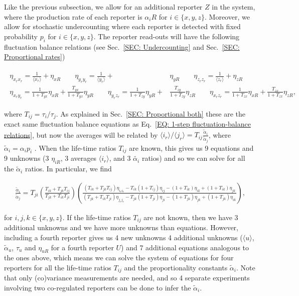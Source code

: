 \documentclass[%
 reprint,prx,
superscriptaddress,
%
%
%
%
%
%
%
%
%
 amsmath,amssymb,
 aps,
%
%
%
%
%
%
]{revtex4-2}
\begin{document}
{{Like the previous subsection, we allow for an additional reporter $Z$ in the system, where the production rate of each reporter is $\alpha_{i}R$ for $i \in \{x,y,z\}$. 
Moreover, we allow for stochastic undercounting where each reporter is detected with fixed probability $p_{i}$ for $i \in \{x,y,z\}$. 
The reporter read-outs will have the following fluctuation balance relations (see Sec.~\ref{SEC: Undercounting} and Sec.~\ref{SEC: Proportional rates})
\begin{widetext}
\begin{align*}
 \begin{split}
  \eta_{x_{r}x_{r}} = \frac{1}{\langle x_{r} \rangle} + \eta_{xR} \quad \quad  \eta_{y_{r}y_{r}} = \frac{1}{\langle y_{r} \rangle} + & \eta_{yR} \quad \quad  \eta_{z_{r}z_{r}} = \frac{1}{\langle z_{r} \rangle} + \eta_{zR} \\
  \eta_{x_{r}y_{r}} = \frac{1}{1 + T_{yx}}\eta_{xR} + \frac{T_{yx}}{1 + T_{yx}}\eta_{yR} \quad \quad \eta_{y_{r}z_{r}} = \frac{1}{1 + T_{zy}}\eta_{yR} + & \frac{T_{zy}}{1 + T_{zy}}\eta_{zR} \quad \quad \eta_{x_{r}z_{r}} = \frac{1}{1 + T_{zx}}\eta_{xR} + \frac{T_{zx}}{1 + T_{zx}}\eta_{zR} ,
 \end{split}
%
\end{align*}
\end{widetext}
where $T_{ij} = \tau_{i}/ \tau_{j}$. As explained in Sec.~\ref{SEC: Proportional both} these are the exact same fluctuation balance equations as Eq.~\eqref{EQ: 1-step fluctuation-balance relations}, but now the averages will be related by $\langle i_{r} \rangle / \langle j_{r} \rangle = T_{ij}\frac{\tilde{\alpha}_{i}}{\tilde{\alpha}_{j}}$, where $\tilde{\alpha}_{i} = \alpha_{i}p_{i}$ . When 
the life-time ratios $T_{ij}$ are known, this gives us 9 equations and 9 unknowns (3 $\eta_{iR}$, 3 averages $\langle i_{r} \rangle$, and 3 $\tilde{\alpha_{i}}$ ratios) and so we can solve for all the $\tilde{\alpha}_{i}$ ratios. In particular, we find %
\begin{widetext}
\begin{align}
 \frac{\tilde{\alpha}_{i}}{\tilde{\alpha}_{j}} = T_{ji}\left(\frac{T_{ik} + T_{jk}T_{ij}}{T_{jk} + T_{ik}T_{ji}}\right) \left(\frac{(T_{ik} + T_{jk}T_{ij})\eta_{i_{r}i_{r}} - T_{ik}(1+T_{ij})\eta_{ij} - (1+T_{ik})\eta_{ik} + (1+T_{ik})\eta_{jk}}{(T_{jk} + T_{ik}T_{ji})\eta_{j_{r}j_{r}} - T_{jk}(1+T_{ji})\eta_{ji} - (1+T_{jk})\eta_{jk} + (1+T_{jk})\eta_{ik}}\right)
,
\end{align}
\end{widetext}
for $i,j,k \in \{x,y,z\}$. If the life-time ratios $T_{ij}$ are not known, then we have 3 additional unknowns and we have more unknowns than equations. However, including a fourth reporter gives us 
4 new unknowns 4 additional unknowns ($\langle u \rangle$, $\tilde{\alpha}_{u}$, $\tau_{u}$ and $\eta_{uR}$ for a fourth reporter $U$) and 7 additional equations analogous to the ones above, which means we can solve the system of equations for four reporters for all the life-time ratios $T_{ij}$ and the proportionality 
constants $\tilde{\alpha}_{i}$. Note that only (co)variance measurements are needed, and so 4 separate experiments involving two co-regulated reporters can be done to infer the $\tilde{\alpha}_{i}$.

}}
\end{document}
